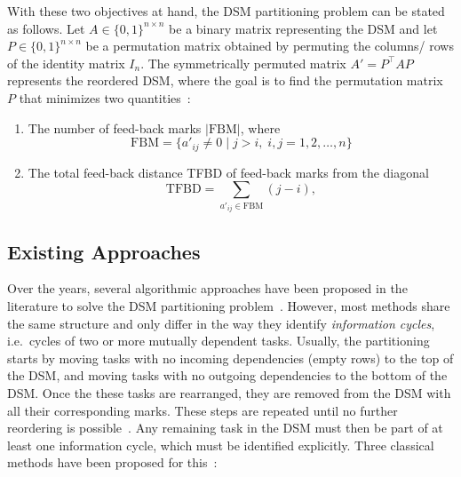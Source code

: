\documentclass[12pt]{article}
\theoremstyle{definition}
\begin{document}
With these two objectives at hand, the DSM partitioning problem can be stated as follows. Let $A \in \{0, 1\}^{n \times n}$ be a binary matrix representing the DSM and let $P \in \{0, 1\}^{n \times n}$ be a permutation matrix obtained by permuting the columns/ rows of the identity matrix $I_n$. The symmetrically permuted matrix $A' = P^\top A P$ represents the reordered DSM, where the goal is to find the permutation matrix $P$ that minimizes two quantities~\cite{hossain_addendum}:

\begin{enumerate}
	\item The number of feed-back marks $|\text{FBM}|$, where
	      \begin{equation*}
		      \text{FBM} = \{ a'_{ij} \neq 0 \mid j > i, \; i,j = 1, 2, \ldots, n \}
	      \end{equation*}

	\item The total feed-back distance TFBD of feed-back marks from the diagonal
	      \begin{equation*}
		      \text{TFBD} = \sum_{a'_{ij} \in \text{FBM}} (j - i),
	      \end{equation*}
\end{enumerate}

\subsection{Existing Approaches}

Over the years, several algorithmic approaches have been proposed in the literature to solve the DSM partitioning problem~\cite{Yassine2001AnIT,eppinger2012}. However, most methods share the same structure and only differ in the way they identify \textit{information cycles}, i.e.~cycles of two or more mutually dependent tasks. Usually, the partitioning starts by moving tasks with no incoming dependencies (empty rows) to the top of the DSM, and moving tasks with no outgoing dependencies to the bottom of the DSM. Once the these tasks are rearranged, they are removed from the DSM with all their corresponding marks. These steps are repeated until no further reordering is possible~\cite{Yassine2001AnIT}. Any remaining task in the DSM must then be part of at least one information cycle, which must be identified explicitly. Three classical methods have been proposed for this~\cite{eppinger2012,Yassine01091999}:
\end{document}
